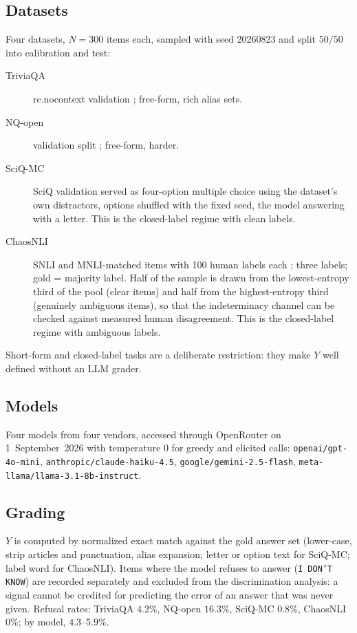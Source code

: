 \documentclass[11pt]{article}
\begin{document}
\subsection{Datasets}
\label{sec:datasets}
Four datasets, $N=300$ items each, sampled with seed 20260823 and split $50/50$ into calibration
and test:
\begin{description}
  \item[TriviaQA] rc.nocontext validation \citep{joshi2017triviaqa}; free-form, rich alias sets.
  \item[NQ-open] validation split \citep{kwiatkowski2019natural,lee2019latent}; free-form, harder.
  \item[SciQ-MC] SciQ validation \citep{welbl2017sciq} served as four-option multiple choice
        using the dataset's own distractors, options shuffled with the fixed seed, the model
        answering with a letter. This is the closed-label regime with clean labels.
  \item[ChaosNLI] SNLI and MNLI-matched items with 100 human labels each
        \citep{nie2020chaosnli}; three labels; gold = majority label. Half of the sample is drawn
        from the lowest-entropy third of the pool (clear items) and half from the highest-entropy
        third (genuinely ambiguous items), so that the indeterminacy channel can be checked
        against measured human disagreement. This is the closed-label regime with ambiguous labels.
\end{description}
Short-form and closed-label tasks are a deliberate restriction: they make $Y$ well defined
without an LLM grader.

\subsection{Models}
Four models from four vendors, accessed through OpenRouter on 1~September~2026 with
temperature $0$ for greedy and elicited calls: \texttt{openai/gpt-4o-mini},
\texttt{anthropic/claude-haiku-4.5}, \texttt{google/gemini-2.5-flash},
\texttt{meta-llama/llama-3.1-8b-instruct}.

\subsection{Grading}
$Y$ is computed by normalized exact match against the gold answer set (lower-case, strip articles
and punctuation, alias expansion; letter or option text for SciQ-MC; label word for ChaosNLI).
Items where the model refuses to answer (\texttt{I DON'T KNOW}) are recorded separately and
excluded from the discrimination analysis: a signal cannot be credited for predicting the error of
an answer that was never given. Refusal rates: TriviaQA $4.2\%$, NQ-open $16.3\%$, SciQ-MC
$0.8\%$, ChaosNLI $0\%$; by model, $4.3$--$5.9\%$.
\end{document}
